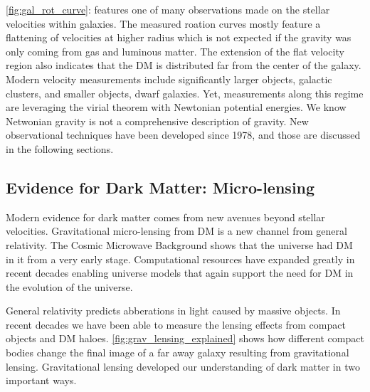 \cref{fig:gal_rot_curve}: features one of many observations made on the stellar velocities within galaxies.
The measured roation curves mostly feature a flattening of velocities at higher radius which is not expected if the gravity was only coming from gas and luminous matter.
The extension of the flat velocity region also indicates that the DM is distributed far from the center of the galaxy.
Modern velocity measurements include significantly larger objects, galactic clusters, and smaller objects, dwarf galaxies.
Yet, measurements along this regime are leveraging the virial theorem with Newtonian potential energies.
We know Netwonian gravity is not a comprehensive description of gravity.
New observational techniques have been developed since 1978, and those are discussed in the following sections.

\subsection{Evidence for Dark Matter: Micro-lensing\label{sec:ev4dm_lens}}

Modern evidence for dark matter comes from new avenues beyond stellar velocities.
Gravitational micro-lensing from DM is a new channel from general relativity.
The Cosmic Microwave Background shows that the universe had DM in it from a very early stage.
Computational resources have expanded greatly in recent decades enabling universe models that again support the need for DM in the evolution of the universe.

General relativity predicts abberations in light caused by massive objects.
In recent decades we have been able to measure the lensing effects from compact objects and DM haloes.
\cref{fig:grav_lensing_explained} shows how different compact bodies change the final image of a far away galaxy resulting from gravitational lensing.
Gravitational lensing developed our understanding of dark matter in two important ways.


